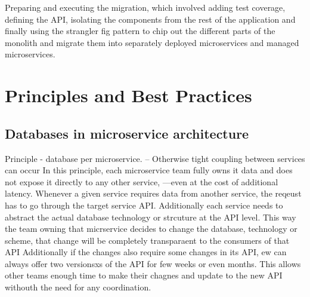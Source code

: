 \documentclass[a4paper, 11pt]{book}
\begin{document}
    Preparing and executing the migration,
    which involved adding test coverage,
    defining the API,
    isolating the components from the rest of the application and finally using the strangler fig pattern to chip out the different parts of
    the monolith and migrate them into separately deployed microservices and managed microservices.


    \section{Principles and Best Practices}

    \subsection{Databases in microservice architecture}
    Principle - database per microservice.
    -- Otherwise tight coupling between services can occur
    In this principle, each microservice team fully owns it data and does not expose it directly to any other service, ---even at the cost of additional latency.
    Whenever a given service requires data from another service, the reqeust has to go through the target service API.
    Additionally each service needs to abstract the actual database technology or strcuture at the API level.
    This way the team owning that micrservice decides to change the database, technology or scheme, that change will be completely transparaent to the consumers of that API
    Additionally if the changes also require some changes in its API, ew can always offer two versionsxs of the API for few weeks or even months.
    This allows other teams enough time to make their chagnes and update to the new API withouth the need for any coordination.
\end{document}

